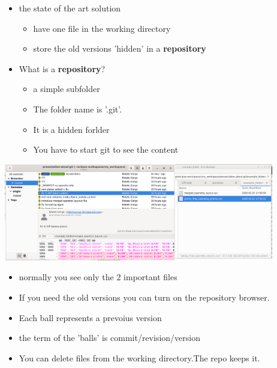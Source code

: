 \documentclass[aspectratio=169]{beamer}
\begin{document}
\begin{frame}

\begin{itemize}
	\item the state of the art solution
	\begin{itemize}
		\item  have one file in the working directory
		\item store the old versions 'hidden' in a \textbf{repository}
	\end{itemize}
	\pause
	\item What is a \textbf{repository}?
	\begin{itemize}
		\item  a simple subfolder 
		\item The folder name is '.git'.
		\item It is a hidden forlder
		\item You have to start git to see the content
	\end{itemize}
\end{itemize}

\end{frame}

\begin{frame}
\includegraphics[height=120pt]{pictures/Screenshot_2020-02-26_10-21-26-folder_in_git.png}

\begin{itemize}
	\item normally you see only the 2 important files 
	\item If you need the old versions you can turn on the repository browser.
	\pause
	\item Each ball represents a prevoius version
	\item the term of the 'balls' is commit/revision/version
	\pause
	\item You can delete files from the working directory.The repo keeps it.
\end{itemize}
\end{frame}
\end{document}
